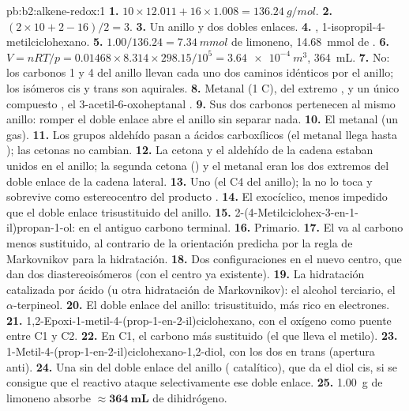 \begin{solution}{pb:b2:alkene-redox:1}
\textbf{1.} $10 \times 12.011 + 16 \times 1.008 = \qty{136.24}{g/mol}$.
\textbf{2.} $(2 \times 10 + 2 - 16)/2 = 3$.
\textbf{3.} Un anillo y dos dobles enlaces.
\textbf{4.} , 1-isopropil-4-metilciclohexano.
\textbf{5.} $1.00/136.24 = \qty{7.34}{mmol}$ de limoneno, \qty{14.68}{mmol} de .
\textbf{6.} $V = nRT/p = 0.01468 \times 8.314 \times 298.15/10^5 = \qty{3.64e-4}{m^3}$,
\qty{364}{mL}.
\textbf{7.} No: los carbonos 1 y 4 del anillo llevan cada uno dos caminos idénticos por el anillo; los isómeros cis y
trans son aquirales.
\textbf{8.} Metanal  (1 C), del extremo , y un único compuesto ,
el 3-acetil-6-oxoheptanal .
\textbf{9.} Sus dos carbonos pertenecen al mismo anillo: romper el doble enlace abre el anillo
sin separar nada.
\textbf{10.} El metanal (un gas).
\textbf{11.} Los grupos aldehído pasan a ácidos carboxílicos (el metanal llega hasta ); las
cetonas no cambian.
\textbf{12.} La cetona y el aldehído de la cadena  estaban unidos en el anillo; la segunda
cetona () y el metanal eran los dos extremos del doble enlace de la cadena lateral.
\textbf{13.} Uno (el C4 del anillo); la  no lo toca y sobrevive como
estereocentro del producto .
\textbf{14.} El  exocíclico, menos impedido que el doble enlace trisustituido del anillo.
\textbf{15.} 2-(4-Metilciclohex-3-en-1-il)propan-1-ol:  en el antiguo carbono
terminal.
\textbf{16.} Primario.
\textbf{17.} El  va al carbono menos sustituido, al contrario de la orientación
predicha por la regla de Markovnikov para la hidratación.
\textbf{18.} Dos configuraciones en el nuevo centro, que dan dos diastereoisómeros (con el centro
ya existente).
\textbf{19.} La hidratación catalizada por ácido (u otra hidratación de Markovnikov): el alcohol terciario,
el $\alpha$-terpineol.
\textbf{20.} El doble enlace del anillo: trisustituido, más rico en electrones.
\textbf{21.} 1,2-Epoxi-1-metil-4-(prop-1-en-2-il)ciclohexano, con el oxígeno como puente entre C1 y C2.
\textbf{22.} En C1, el carbono más sustituido (el que lleva el metilo).
\textbf{23.} 1-Metil-4-(prop-1-en-2-il)ciclohexano-1,2-diol, con los dos  en trans (apertura
anti).
\textbf{24.} Una  sin del doble enlace del anillo ( catalítico), que da el diol
cis, si se consigue que el reactivo ataque selectivamente ese doble enlace.
\textbf{25.} \qty{1.00}{g} de limoneno absorbe $\boldsymbol{\approx \qty{364}{mL}}$ de
dihidrógeno.
\end{solution}
